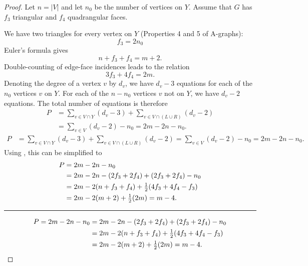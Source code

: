 \begin{proof}
Let $n=|V|$ and let $n_0$ be the number
of vertices on $Y$. Assume that $G$ has $f_3$ triangular and $f_4$
quadrangular faces.

We have two triangles for every vertex on $Y$ (Properties 4 and 5 of A-graphs):
\begin{equation}
\label{eq:f3}
f_3 = 2n_0
\end{equation}
Euler's formula gives
\begin{equation}
\label{eq:Euler}
n + f_3+f_4 = m+2.
\end{equation}
Double-counting of edge-face incidences leads to the relation
\begin{equation}
\label{eq:edge-face}
3f_3+4f_4=2m.
\end{equation}
Denoting the degree of a vertex $v$ by $d_v$,
we have $d_v-3$ equations for each of the $n_0$ vertices $v$ on $Y$. For each of the 
$n-n_0$ vertices $v$ not on $Y$, 
we have $d_v-2$ equations.
The total number of equations is therefore
\ifSODA
\begin{align*}
P &= 
\sum_{v\in V\cap Y}(d_v-3)+
    \sum_{v\in V\cap(L\cup R)}(d_v-2)
  \\&
=
\sum_{v\in V}(d_v-2)-n_0
=
2m-2n-n_0.
\end{align*}
\else
\begin{align*}
P &= 
\sum_{v\in V\cap Y}(d_v-3)+
    \sum_{v\in V\cap(L\cup R)}(d_v-2)
=
\sum_{v\in V}(d_v-2)-n_0
=
2m-2n-n_0.
\end{align*}
\fi
Using \thetag{\ref{eq:f3}--\ref{eq:edge-face}}, this can be
simplified to
\ifSODA
\begin{align*}
  P&
      =
   2m-2n-n_0\\
 &
                 = 2m -2n -(2f_3+2f_4) +(2f_3+2f_4)-n_0\\
&= 2m -2(n +f_3+f_4) +\tfrac12(4f_3+4f_4-f_3)\\
 &= 2m -2(m+2) +\tfrac12(2m) = m-4.
   \qedhere
\end{align*}
\vspace{-2,2\baselineskip}
\hrule height 0pt
\else
\begin{align*}
  P%
      =
   2m-2n-n_0%
 &
                 = 2m -2n -(2f_3+2f_4) +(2f_3+2f_4)-n_0\\
&= 2m -2(n +f_3+f_4) +\tfrac12(4f_3+4f_4-f_3)\\
 &= 2m -2(m+2) +\tfrac12(2m) = m-4.
   \qedhere
\end{align*}
\fi
\end{proof}

